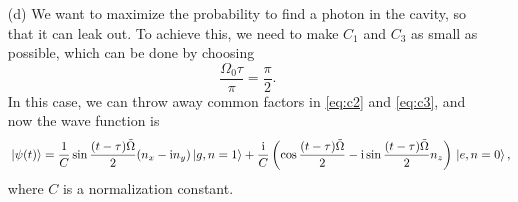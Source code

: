 \documentclass[hyperref, a4paper]{article}
\newcommand*{\ii}{\mathrm{i}}
\begin{document}
\begin{itemize}
\item[(d)] We want to maximize the probability to find a photon in the cavity, so that it can leak out.
To achieve this, we need to make $C_1$ and $C_3$ as small as possible, which can be done by choosing 
\begin{equation}
    \frac{\Omega_0 \tau}{\pi} = \frac{\pi}{2}.
\end{equation}
In this case, we can throw away common factors in \eqref{eq:c2} and \eqref{eq:c3}, and now the wave function 
is 
\begin{equation}
    \ket*{\psi(t)} = \frac{1}{C} \sin \frac{(t - \tau) \tilde{\Omega}}{2} (n_x - \ii n_y) \ket*{g, n=1} + \frac{\ii}{C} \left( \cos \frac{(t - \tau) \tilde{\Omega}}{2} - \ii \sin \frac{(t - \tau) \tilde{\Omega}}{2} n_z \right) \ket*{e, n=0},
\end{equation}
where $C$ is a normalization constant. 

\end{itemize}
\end{document}
